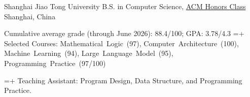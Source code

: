 
\VectraEducationEntry
    {{Shanghai Jiao Tong University}}
    {B.S. in Computer Science, \href{https://acm.sjtu.edu.cn/home}{ACM Honors Class}}
    {Shanghai, China}
    {}

\VectraEducationBulletList
    {Cumulative average grade (through June 2026): 88.4/100; GPA: 3.78/4.3}
    {\hangindent=\dimexpr\VectraEducationBulletIndent+\VectraEducationBulletLabelWidth\relax
    Selected Courses: \mbox{Mathematical Logic (97)}, \mbox{Computer Architecture (100)},
    \mbox{Machine Learning (94)}, \mbox{Large Language Model (95)},
    \mbox{Programming Practice (97/100)}}

\VectraEducationBulletList
    {\hangindent=\dimexpr\VectraEducationBulletIndent+\VectraEducationBulletLabelWidth\relax
    Teaching Assistant: Program Design, Data Structure, and Programming Practice.}
    {}
